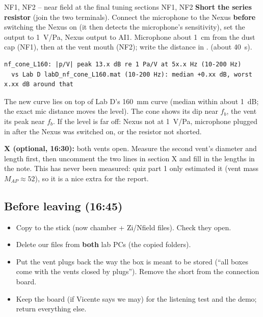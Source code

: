 \documentclass[a4paper,10pt]{article}
\newcommand{\file}[1]{\texttt{\detokenize{#1}}}
\newcommand{\cmd}[1]{\texttt{\detokenize{#1}}}
\newcommand{\tick}{$\square$\ }
\begin{document}
\begin{runbox}{NF1, NF2 -- near field at the final tuning \hfill \normalfont sections NF1, NF2}
\textbf{Short the series resistor} (join the two terminals). Connect the microphone to the Nexus
\textbf{before} switching the Nexus on (it then detects the microphone's sensitivity), set the output to
\SI{1}{V/Pa}, Nexus output to AI1. Microphone about \SI{1}{cm} from the dust cap (NF1), then at the vent
mouth (NF2); write the distance in \cmd{d.nf_mic_dist}. \cmd{Nav = 4} (about \SI{40}{s}).
\begin{checkbox}
\begin{Verbatim}[fontsize=\footnotesize]
nf_cone_L160: |p/V| peak 13.x dB re 1 Pa/V at 5x.x Hz (10-200 Hz)
  vs Lab D labD_nf_cone_L160.mat (10-200 Hz): median +0.xx dB, worst x.xx dB around that
\end{Verbatim}
The new curve lies on top of Lab D's \SI{160}{mm} curve (median within about \SI{1}{dB}; the exact mic
distance moves the level). The cone shows its dip near $f_b$, the vent its peak near $f_b$. If the level
is far off: Nexus not at 1~V/Pa, microphone plugged in after the Nexus was switched on, or the resistor
not shorted.
\end{checkbox}
\end{runbox}

\textbf{X (optional, 16:30):} both vents open. Measure the second vent's diameter and length first, then
uncomment the two lines in section X and fill in the lengths in the note. This has never been measured:
quiz part 1 only estimated it (vent mass $M_{AP} \approx 52$), so it is a nice extra for the report.

\subsection{Before leaving (16:45)}
\begin{itemize}[leftmargin=14pt]
\item[\tick] Copy \file{lab-day/data/} to the stick (now chamber + Zi/Nfield files). Check they open.
\item[\tick] Delete our files from \textbf{both} lab PCs (the copied \file{Labs/} folders).
\item[\tick] Put the vent plugs back the way the box is meant to be stored (``all boxes come with the
  vents closed by plugs''). Remove the short from the connection board.
\item[\tick] Keep the board (if Vicente says we may) for the listening test and the demo; return everything
  else.
\end{itemize}
\end{document}
